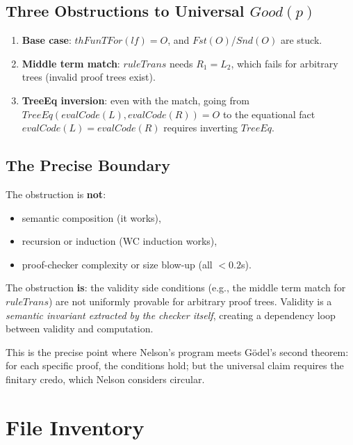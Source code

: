 \documentclass[11pt]{article}
\begin{document}
\subsection{Three Obstructions to Universal $\mathit{Good}(p)$}

\begin{enumerate}
\item \textbf{Base case}: $\mathit{thFunTFor}(\mathit{lf}) = O$,
  and $\mathit{Fst}(O)$/$\mathit{Snd}(O)$ are stuck.
\item \textbf{Middle term match}: $\mathit{ruleTrans}$ needs
  $R_1 = L_2$, which fails for arbitrary trees (invalid proof trees exist).
\item \textbf{TreeEq inversion}: even with the match, going from
  $\mathit{TreeEq}(\mathit{evalCode}(L), \mathit{evalCode}(R)) = O$
  to the equational fact $\mathit{evalCode}(L) = \mathit{evalCode}(R)$
  requires inverting $\mathit{TreeEq}$.
\end{enumerate}

\subsection{The Precise Boundary}

The obstruction is \textbf{not}:
\begin{itemize}
\item semantic composition (it works),
\item recursion or induction (WC induction works),
\item proof-checker complexity or size blow-up (all $< 0.2$s).
\end{itemize}

The obstruction \textbf{is}: the validity side conditions (e.g.,
the middle term match for $\mathit{ruleTrans}$) are not uniformly
provable for arbitrary proof trees. Validity is a \emph{semantic
invariant extracted by the checker itself}, creating a dependency
loop between validity and computation.

This is the precise point where Nelson's program meets G\"odel's
second theorem: for each specific proof, the conditions hold; but
the universal claim requires the finitary credo, which Nelson
considers circular.

\section{File Inventory}
\end{document}

